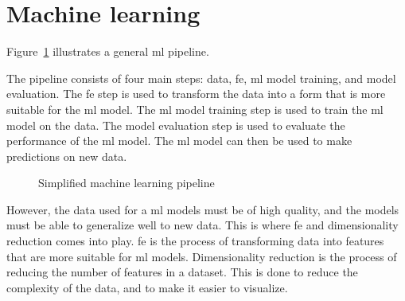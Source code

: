 \section{Machine learning}\label{sec:machine-learning}
Figure~\ref{fig:basic-machine-learning-pipeline} illustrates a general \gls{ml} pipeline.

The pipeline consists of four main steps: data, \gls{fe}, \gls{ml} model training, and model evaluation. The \gls{fe} step is used to transform the data into a form that is more suitable for the \gls{ml} model. The \gls{ml} model training step is used to train the \gls{ml} model on the data. The model evaluation step is used to evaluate the performance of the \gls{ml} model. The \gls{ml} model can then be used to make predictions on new data. 


\begin{figure}[htb!]
    \centering
    \caption{Simplified machine learning pipeline}
    \label{fig:basic-machine-learning-pipeline}
\end{figure}


However, the data used for a \gls{ml} models must be of high quality, and the models must be able to generalize well to new data. This is where \gls{fe} and dimensionality reduction comes into play. \gls{fe} is the process of transforming data into features that are more suitable for \gls{ml} models. Dimensionality reduction is the process of reducing the number of features in a dataset. This is done to reduce the complexity of the data, and to make it easier to visualize.